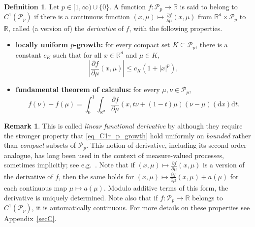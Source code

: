 \documentclass{article}
\theoremstyle{definition}
\newtheorem{definition}[theorem]{Definition}
\newtheorem{remark}[theorem]{\textbf{Remark}}
\numberwithin{equation}{section}
\numberwithin{theorem}{section}
\newcommand{\R}{\mathbb{R}}
\newcommand{\dx}{\mathrm{d}x}
\newcommand{\dt}{\mathrm{d}t}
\newcommand{\Pcal}{{\mathcal P}}
\begin{document}
\begin{definition}\label{D_C1r}
Let $p \in [1,\infty) \cup \{0\}$. A function $f\colon\Pcal_p\to\R$ is said to belong to $C^1(\Pcal_p)$ if there is a continuous function $(x,\mu)\mapsto\frac{\partial f}{\partial\mu}(x,\mu)$ from  ${\R^d}\times\Pcal_p$ to $\R$, called (a version of) the \emph{derivative} of $f$, with the following properties.
\begin{itemize}
\item \textbf{locally uniform $p$-growth:} for every compact set $K\subseteq\Pcal_p$, there is a constant $c_K$ such that for all  $x\in {\R^d}$ and $\mu\in K$,
\begin{equation}\label{eq_C1r_p_growth}
\left| \frac{\partial f}{\partial\mu}(x,\mu) \right| \le c_K (1+|x|^p),
\end{equation}
\item \textbf{fundamental theorem of calculus:} for every $\mu,\nu\in\Pcal_p$,
\begin{equation}\label{eq_C1r_FTC}
f(\nu) - f(\mu) = \int_0^1 \int_{\R^d} \frac{\partial f}{\partial\mu}(x,t\nu + (1-t)\mu)(\nu-\mu)(\dx)\dt.
\end{equation}
\end{itemize}
\end{definition}


\begin{remark}
  This is called \emph{linear functional derivative} by \cite[Definition~5.43]{car_del_18_I} although they require the stronger property that \eqref{eq_C1r_p_growth} hold uniformly on \emph{bounded} rather than \emph{compact} subsets of $\Pcal_p$. This notion of derivative, including its second-order analogue, has long been used in the context of measure-valued processes, sometimes implicitly; see e.g.~\cite{MR542340,dawson1993}. Note that  if  $(x,\mu)\mapsto\frac{\partial f}{\partial\mu}(x,\mu)$ is a version of the derivative of $f$, then the same holds for $(x,\mu)\mapsto\frac{\partial f}{\partial\mu}(x,\mu)+a(\mu)$ for each continuous map  $\mu\mapsto a(\mu)$. Modulo additive terms of this form, the derivative is uniquely determined. Note also that if $f:\Pcal_p\to\R$ belongs to $C^1(\Pcal_p)$, it is automatically continuous. For more details on these properties see Appendix~\ref{secC}.
 \end{remark}
\end{document}
